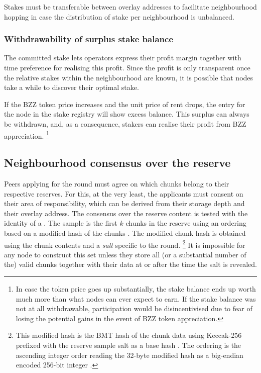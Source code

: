 Stakes must be transferable between overlay addresses to facilitate neighbourhood hopping in case the distribution of stake per neighbourhood is unbalanced. 

\subsubsection{Withdrawability of surplus stake balance}



The committed stake lets operators express their  profit margin together with time preference for realising this profit. Since the profit is only transparent once the relative stakes within the neighbourhood are known, it is possible that nodes take a while to discover their optimal stake. 

If the BZZ token price increases and the unit price of rent drops, the entry for the node in the stake registry will show excess balance. This surplus can always be withdrawn,
and, as a consequence, stakers can realise their profit from BZZ appreciation.%
%
\footnote{In case the token price goes up substantially, the stake balance ends up worth much more than what nodes can ever expect to earn. If the stake balance was not at all withdrawable, participation would be disincentivised due to fear of losing the potential gains in the event of BZZ token appreciation.}
% 

 
\subsection{Neighbourhood consensus over the reserve}\label{sec:por}

Peers applying for the round must agree on which chunks belong to their respective reserves. For this, at the very least, the applicants must consent on their area of responsibility, which can be derived from their storage depth and their overlay address.  
The consensus over the reserve content is tested with the identity of a .
The sample is the first $k$ chunks in the reserve using an ordering based on a modified hash of the chunks%
.  The modified chunk hash is  obtained using the chunk contents and a \emph{salt} specific to the round.%
%
\footnote{This modified hash is the BMT hash of the chunk data using Keccak-256 prefixed with the reserve sample salt as a base hash%
. The ordering is the ascending integer order reading the 32-byte modified hash as a big-endian encoded 256-bit integer%
.}
%
It is impossible for any node to construct this set unless they store all (or a substantial number of the) valid chunks together with their data at or after the time the salt is revealed. 

